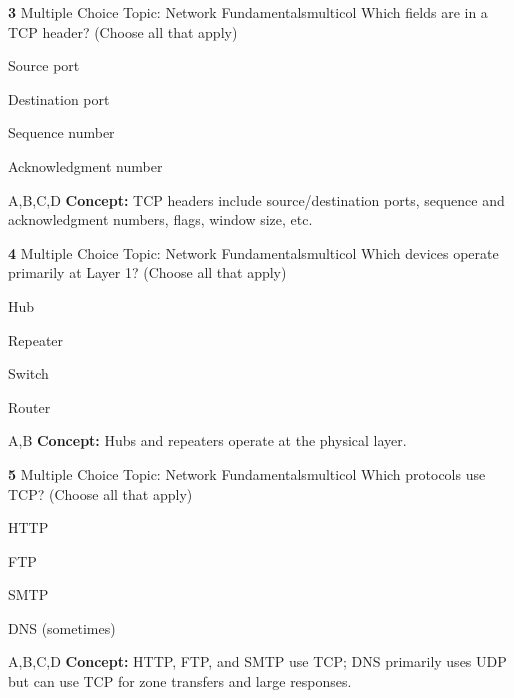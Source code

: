 \documentclass[10pt,a4paper]{article}
\begin{document}
\begin{qcard}{\color{white}\textbf{3} \hfill \small Multiple Choice \textbar{} Topic: Network Fundamentals}{multicol}
Which fields are in a TCP header? (Choose all that apply)

\begin{qoptions}
\item Source port
\item Destination port
\item Sequence number
\item Acknowledgment number
\end{qoptions}
\begin{explainbox}{A,B,C,D}
\textbf{Concept:} TCP headers include source/destination ports, sequence and acknowledgment numbers, flags, window size, etc.
\end{explainbox}
\end{qcard}

\begin{qcard}{\color{white}\textbf{4} \hfill \small Multiple Choice \textbar{} Topic: Network Fundamentals}{multicol}
Which devices operate primarily at Layer 1? (Choose all that apply)

\begin{qoptions}
\item Hub
\item Repeater
\item Switch
\item Router
\end{qoptions}
\begin{explainbox}{A,B}
\textbf{Concept:} Hubs and repeaters operate at the physical layer.
\end{explainbox}
\end{qcard}

\begin{qcard}{\color{white}\textbf{5} \hfill \small Multiple Choice \textbar{} Topic: Network Fundamentals}{multicol}
Which protocols use TCP? (Choose all that apply)

\begin{qoptions}
\item HTTP
\item FTP
\item SMTP
\item DNS (sometimes)
\end{qoptions}
\begin{explainbox}{A,B,C,D}
\textbf{Concept:} HTTP, FTP, and SMTP use TCP; DNS primarily uses UDP but can use TCP for zone transfers and large responses.
\end{explainbox}
\end{qcard}
\end{document}
